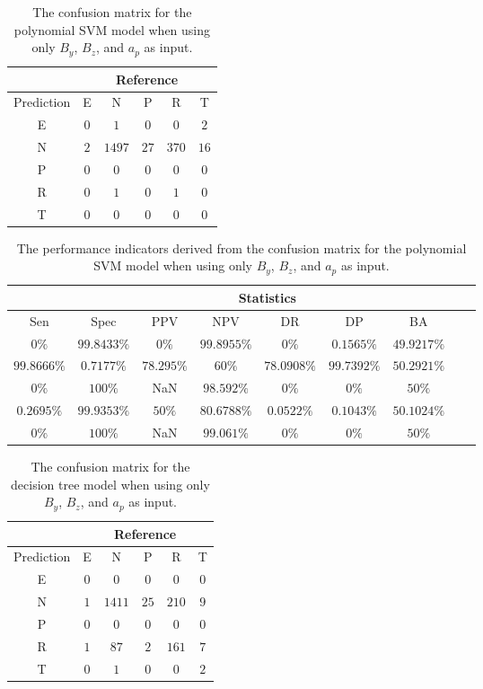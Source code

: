 \begin{table}[!ht]
	\centering
	\begin{tabular}{|c|c|c|c|c|c|}
		\hline
		 & \multicolumn{5}{|c|}{Reference} \\ \hline
		 Prediction & E & N & P & R & T \\ \hline
		 E & $0$ & $1$ & $0$ & $0$ & $2$ \\ \hline
		 N & $2$ & $1497$ & $27$ & $370$ & $16$ \\ \hline
		 P & $0$ & $0$ & $0$ & $0$ & $0$ \\ \hline
		 R & $0$ & $1$ & $0$ & $1$ & $0$ \\ \hline
		 T & $0$ & $0$ & $0$ & $0$ & $0$ \\ \hline
	\end{tabular}
	\caption{The confusion matrix for the polynomial SVM model when using only $B_{y}$, $B_{z}$, and $a_{p}$ as input.}
	\label{tab:cm:yzap:svmPoly}
\end{table}

\begin{table}[!ht]
	\centering
	\begin{tabular}{|c|c|c|c|c|c|c|c|c|}
		\hline
		 & \multicolumn{7}{c|}{Statistics} \\ \hline
		Sen & Spec & PPV & NPV & DR & DP & BA \\ \hline
		$0\%$ & $99.8433\%$ & $0\%$ & $99.8955\%$ & $0\%$ & $0.1565\%$ & $49.9217\%$ \\ \hline
		$99.8666\%$ & $0.7177\%$ & $78.295\%$ & $60\%$ & $78.0908\%$ & $99.7392\%$ & $50.2921\%$ \\ \hline
		$0\%$ & $100\%$ & NaN & $98.592\%$ & $0\%$ & $0\%$ & $50\%$ \\ \hline
		$0.2695\%$ & $99.9353\%$ & $50\%$ & $80.6788\%$ & $0.0522\%$ & $0.1043\%$ & $50.1024\%$ \\ \hline
		$0\%$ & $100\%$ & NaN & $99.061\%$ & $0\%$ & $0\%$ & $50\%$ \\ \hline
	\end{tabular}
	\caption{The performance indicators derived from the confusion matrix for the polynomial SVM model when using only $B_{y}$, $B_{z}$, and $a_{p}$ as input.}
	\label{tab:cs:yzap:svmPoly}
\end{table}

\begin{table}[!ht]
	\centering
	\begin{tabular}{|c|c|c|c|c|c|}
		\hline
		 & \multicolumn{5}{|c|}{Reference} \\ \hline
		 Prediction & E & N & P & R & T \\ \hline
		 E & $0$ & $0$ & $0$ & $0$ & $0$ \\ \hline
		 N & $1$ & $1411$ & $25$ & $210$ & $9$ \\ \hline
		 P & $0$ & $0$ & $0$ & $0$ & $0$ \\ \hline
		 R & $1$ & $87$ & $2$ & $161$ & $7$ \\ \hline
		 T & $0$ & $1$ & $0$ & $0$ & $2$ \\ \hline
	\end{tabular}
	\caption{The confusion matrix for the decision tree model when using only $B_{y}$, $B_{z}$, and $a_{p}$ as input.}
	\label{tab:cm:yzap:C5.0}
\end{table}

